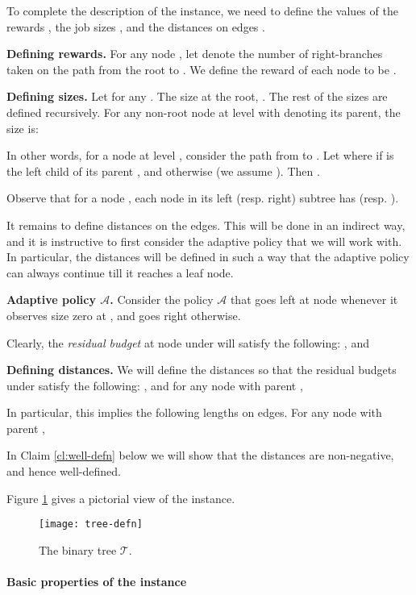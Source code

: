 \documentclass[11pt,letterpaper]{article}
\numberwithin{algorithm}{section}
\newcommand{\A}[0]{{\ensuremath{\mathcal{A}}}\xspace}
\newcommand{\T}{\ensuremath{\mathcal{T}}\xspace}
\begin{document}
To complete the description of the instance, we need to define the values of the rewards , the job sizes , and the distances  on edges .

{\bf Defining rewards.} For any node , let  denote the number of right-branches taken on the path from the root to . We define the reward of each node  to be .

{\bf Defining sizes.} Let  for any . The size at the root, . The rest of the sizes are defined recursively. For any non-root node  at level  with  denoting its parent, the size is:


In other words, for a node  at level , consider the path   from  to . Let 
where  if  is the left child of its parent , and  otherwise (we assume ).
Then .

Observe that for a node , each node  in its left (resp. right) subtree has  (resp. ).

It remains to define distances on the edges. This will be done in an indirect way, and it is instructive to first consider the adaptive policy that we will work with. In particular, the distances will be defined in such a way that the adaptive policy can always continue till it reaches a leaf node.



{\bf Adaptive policy \A.} Consider the policy \A  that goes left at node  whenever it observes size zero at , and goes right otherwise.

Clearly, the {\em residual budget}  at node  under   will satisfy the following:
, and


{\bf Defining distances.} We will define the distances so that the residual budgets  under  satisfy the following:
, and for any node  with parent ,


In particular, this implies the following lengths on edges. For any node  with parent ,


In Claim \ref{cl:well-defn} below we will show that the distances are non-negative, and hence well-defined.


Figure \ref{fig:tree-def} gives a pictorial view of the instance.

\begin{figure}[ht]
  \begin{centering}
    \texttt{[image: tree-defn]}
    \caption{The binary tree \T. \label{fig:tree-def}}
  \end{centering}
\end{figure}


\paragraph{Basic properties of the instance}
\end{document}
